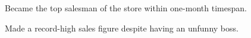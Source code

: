 \begin{achievements}
	\item Became the top salesman of the store within one-month timespan.
	\item Made a record-high sales figure despite having an unfunny boss.
\end{achievements}
